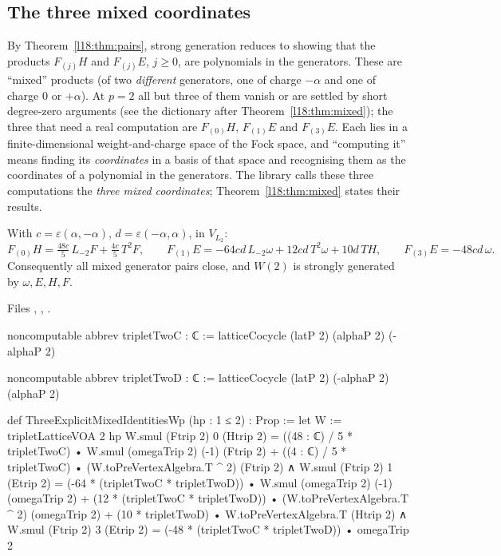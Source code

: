 \subsection{The three mixed coordinates}\label{l18:sec:mixed}
By Theorem~\ref{l18:thm:pairs}, strong generation reduces to showing that the products $F_{(j)}H$
and $F_{(j)}E$, $j\ge0$, are polynomials in the generators. These are ``mixed'' products (of two
\emph{different} generators, one of charge $-\alpha$ and one of charge $0$ or $+\alpha$). At $p=2$ all
but three of them vanish or are settled by short degree-zero arguments (see the dictionary after
Theorem~\ref{l18:thm:mixed}); the three that need a real computation are $F_{(0)}H$, $F_{(1)}E$ and
$F_{(3)}E$. Each lies in a finite-dimensional weight-and-charge space of the Fock space, and
``computing it'' means finding its \emph{coordinates} in a basis of that space and recognising them as
the coordinates of a polynomial in the generators. The library calls these three computations the
\emph{three mixed coordinates}; Theorem~\ref{l18:thm:mixed} states their results.
\begin{theorem}[Mixed products at $p=2$]\label{l18:thm:mixed}
With $c=\varepsilon(\alpha,-\alpha)$, $d=\varepsilon(-\alpha,\alpha)$, in $V_{L_2}$:
\begin{equation*}
F_{(0)}H=\tfrac{48c}{5}\,L_{-2}F+\tfrac{4c}{5}\,T^2F,\qquad
F_{(1)}E=-64cd\,L_{-2}\omega+12cd\,T^2\omega+10d\,TH,\qquad
F_{(3)}E=-48cd\,\omega .
\end{equation*}
Consequently all mixed generator pairs close, and $W(2)$ is strongly generated by $\omega,E,H,F$.
\end{theorem}
\noindent Files ,
, .
\begin{leancode}
noncomputable abbrev tripletTwoC : ℂ :=
  latticeCocycle (latP 2) (alphaP 2) (-alphaP 2)

noncomputable abbrev tripletTwoD : ℂ :=
  latticeCocycle (latP 2) (-alphaP 2) (alphaP 2)

def ThreeExplicitMixedIdentitiesWp (hp : 1 ≤ 2) : Prop :=
  let W := tripletLatticeVOA 2 hp
  W.smul (Ftrip 2) 0 (Htrip 2) =
      ((48 : ℂ) / 5 * tripletTwoC) • W.smul (omegaTrip 2) (-1) (Ftrip 2) +
        ((4 : ℂ) / 5 * tripletTwoC) • (W.toPreVertexAlgebra.T ^ 2) (Ftrip 2) ∧
  W.smul (Ftrip 2) 1 (Etrip 2) =
      (-64 * (tripletTwoC * tripletTwoD)) • W.smul (omegaTrip 2) (-1) (omegaTrip 2) +
        (12 * (tripletTwoC * tripletTwoD)) • (W.toPreVertexAlgebra.T ^ 2) (omegaTrip 2) +
          (10 * tripletTwoD) • W.toPreVertexAlgebra.T (Htrip 2) ∧
  W.smul (Ftrip 2) 3 (Etrip 2) =
      (-48 * (tripletTwoC * tripletTwoD)) • omegaTrip 2
\end{leancode}
